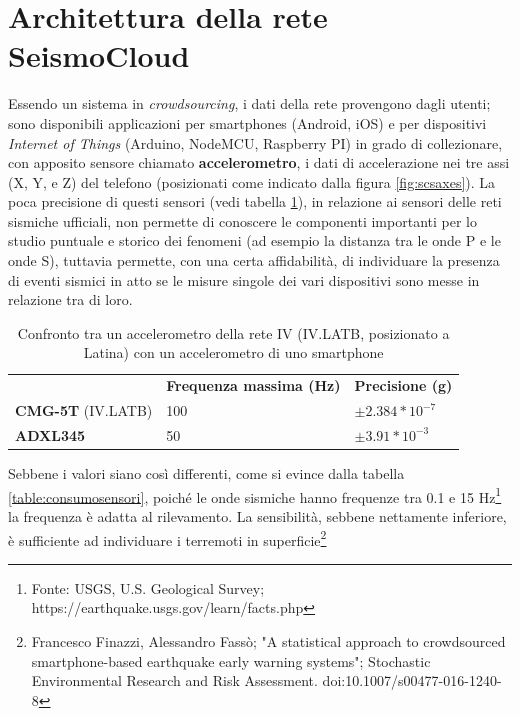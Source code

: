 \documentclass[a4paper,10pt]{memoir}
\begin{document}
\section{Architettura della rete SeismoCloud}

Essendo un sistema in \textit{crowdsourcing}, i dati della rete provengono dagli utenti; sono disponibili applicazioni per smartphones (Android, iOS) e per dispositivi \textit{Internet of Things} (Arduino, NodeMCU, Raspberry PI) in grado di collezionare, con apposito sensore chiamato \textbf{accelerometro}, i dati di accelerazione nei tre assi (X, Y, e Z) del telefono (posizionati come indicato dalla figura \ref{fig:scsaxes}). La poca precisione di questi sensori (vedi tabella \ref{table:datisensori}), in relazione ai sensori delle reti sismiche ufficiali, non permette di conoscere le componenti importanti per lo studio puntuale e storico dei fenomeni (ad esempio la distanza tra le onde P e le onde S), tuttavia permette, con una certa affidabilità, di individuare la presenza di eventi sismici in atto se le misure singole dei vari dispositivi sono messe in relazione tra di loro.

\begin{table}[h]
\centering
\caption{Confronto tra un accelerometro della rete IV (IV.LATB, posizionato a Latina) con un accelerometro di uno smartphone}
\label{table:datisensori}
\begin{tabular}{lll}
                    & \textbf{Frequenza massima (Hz)} & \textbf{Precisione (g)} \\
\textbf{CMG-5T} (IV.LATB) & 100 & $\pm 2.384 * 10^{-7}$ \\
\textbf{ADXL345}          & 50 & $\pm 3.91 * 10^{-3}$
\end{tabular}
\end{table}

Sebbene i valori siano così differenti, come si evince dalla tabella \ref{table:consumosensori}, poiché le onde sismiche hanno frequenze tra 0.1 e 15 Hz\footnote{Fonte: USGS, U.S. Geological Survey; https://earthquake.usgs.gov/learn/facts.php} la frequenza è adatta al rilevamento. La sensibilità, sebbene nettamente inferiore, è sufficiente ad individuare i terremoti in superficie\footnote{    Francesco Finazzi, Alessandro Fassò; "A statistical approach to crowdsourced smartphone-based earthquake early warning systems"; Stochastic Environmental Research and Risk Assessment.  doi:10.1007/s00477-016-1240-8}
\end{document}
